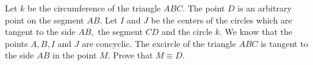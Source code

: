 Let $k$ be the circumference of the triangle $ABC.$ The point $D$ is an arbitrary point on the segment $AB.$ Let $I$ and $J$ be the centers of the circles which are tangent to the side $AB,$ the segment $CD$ and the circle $k.$ We know that the points $A, B, I$ and $J$ are concyclic. The excircle of the triangle $ABC$  is tangent to the side $AB$ in the point $M.$ Prove that $M \equiv D.$